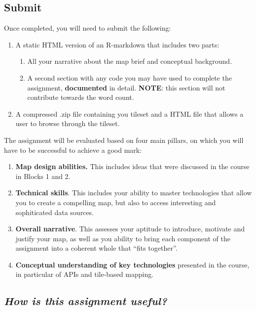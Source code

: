 \documentclass[
  letterpaper,
  DIV=11,
  numbers=noendperiod]{scrreprt}
\begin{document}
\hypertarget{submit}{%
\subsection*{Submit}\label{submit}}

Once completed, you will need to submit the following:

\begin{enumerate}
\def\labelenumi{\arabic{enumi}.}
\item
  A static HTML version of an R-markdown that includes two parts:

  \begin{enumerate}
  \def\labelenumii{\arabic{enumii}.}
  \item
    All your narrative about the map brief and conceptual background.
  \item
    A second section with any code you may have used to complete the
    assignment, \textbf{documented} in detail. \textbf{NOTE}: this
    section will not contribute towards the word count.
  \end{enumerate}
\item
  A compressed .zip file containing you tileset and a HTML file that
  allows a user to browse through the tileset.
\end{enumerate}

The assignment will be evaluated based on four main pillars, on which
you will have to be successful to achieve a good mark:

\begin{enumerate}
\def\labelenumi{\arabic{enumi}.}
\item
  \textbf{Map design abilities.} This includes ideas that were discussed
  in the course in Blocks 1 and 2.
\item
  \textbf{Technical skills}. This includes your ability to master
  technologies that allow you to create a compelling map, but also to
  access interesting and sophiticated data sources.
\item
  \textbf{Overall narrative}. This assesses your aptitude to introduce,
  motivate and justify your map, as well as you ability to bring each
  component of the assignment into a coherent whole that ``fits
  together''.
\item
  \textbf{Conceptual understanding of key technologies} presented in the
  course, in particular of APIs and tile-based mapping.
\end{enumerate}

\hypertarget{how-is-this-assignment-useful}{%
\subsection*{\texorpdfstring{\emph{How is this assignment
useful?}}{How is this assignment useful?}}\label{how-is-this-assignment-useful}}
\end{document}
